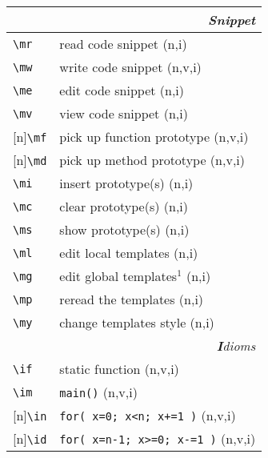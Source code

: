 \documentclass[oneside,11pt,landscape,DIV16]{scrartcl}
\newcommand{\Rep}{{\tiny{[n]}}}
\begin{document}
\begin{multicols}{3}
\begin{center}
%
\begin{tabular}[]{|p{11mm}|p{60mm}|}
\hline 
\multicolumn{2}{|r|}{\textsl{S\textbf{n}ippet}} \\
\hline     \verb'\mr' & read code snippet          \hfill (n,i)   \\
\hline     \verb'\mw' & write code snippet         \hfill (n,v,i) \\
\hline     \verb'\me' & edit code snippet          \hfill (n,i)   \\
\hline     \verb'\mv' & view code snippet          \hfill (n,i)   \\
\hline \Rep\verb'\mf' & pick up function prototype \hfill (n,v,i) \\
\hline \Rep\verb'\md' & pick up method prototype   \hfill (n,v,i) \\
\hline     \verb'\mi' & insert prototype(s)        \hfill (n,i)   \\
\hline     \verb'\mc' & clear  prototype(s)        \hfill (n,i)   \\
\hline     \verb'\ms' & show   prototype(s)        \hfill (n,i)   \\
%
\hline \verb'\ml'     & edit local templates      \hfill (n,i)    \\
\hline \verb'\mg'     & edit global templates$^1$ \hfill (n,i)    \\
\hline \verb'\mp'     & reread the templates      \hfill (n,i)    \\
\hline \verb'\my'     & change templates style    \hfill (n,i)    \\
\hline
\hline 
\multicolumn{2}{|r|}{\textsl{\textbf{I}dioms}}   \\
\hline \verb'\if'     & static function                  \hfill (n,v,i) \\
\hline \verb'\im'     & \verb'main()'                    \hfill (n,v,i) \\
\hline \Rep\verb'\in' & \verb'for( x=0; x<n; x+=1 )'     \hfill (n,v,i) \\
\hline \Rep\verb'\id' & \verb'for( x=n-1; x>=0; x-=1 )'  \hfill (n,v,i) \\

\end{tabular}
\end{center}
\end{multicols}
\end{document}
